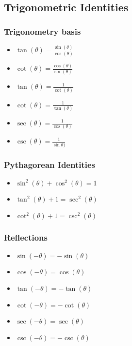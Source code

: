 \documentclass[a4paper, 15pt]{article}
\begin{document}
		\subsection{Trigonometric Identities}
			\subsubsection{Trigonometry basis}
				\begin{itemize}
					\item $\tan(\theta) = \frac{\sin(\theta)}{\cos(\theta)}$
					\item $\cot(\theta) = \frac{\cos(\theta)}{\sin(\theta)}$
					\item $\tan(\theta) = \frac{1}{\cot(\theta)}$
					\item $\cot(\theta) = \frac{1}{\tan(\theta)}$
					\item $\sec(\theta) = \frac{1}{\cos(\theta)}$
					\item $\csc(\theta) = \frac{1}{\sin\theta)}$
				\end{itemize}
			\subsubsection{Pythagorean Identities}
				\begin{itemize}
					\item $\sin^2(\theta) + \cos^2(\theta) = 1$
					\item $\tan^2(\theta) + 1 = \sec^2(\theta)$
					\item $\cot^2(\theta) + 1 = \csc^2(\theta)$
				\end{itemize}

			\subsubsection{Reflections}
				\begin{itemize}
					\item $\sin(-\theta) = -\sin(\theta)$
					\item $\cos(-\theta) = \cos(\theta)$
					\item $\tan(-\theta) = -\tan(\theta)$
					\item $\cot(-\theta) = -\cot(\theta)$
					\item $\sec(-\theta) = \sec(\theta)$
					\item $\csc(-\theta) =  -\csc(\theta)$ 
				\end{itemize}
\end{document}
